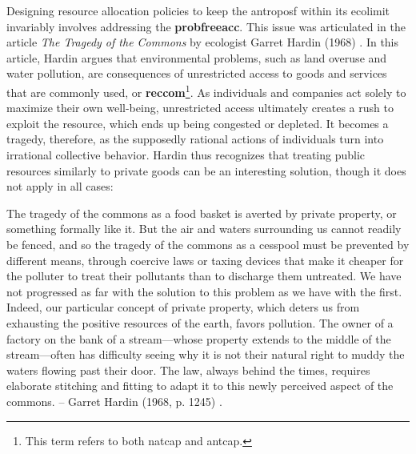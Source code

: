 \documentclass[./main_en.tex]{subfiles}
\begin{document}
\par Designing resource allocation policies to keep the \gls{antroposf} within its \gls{ecolimit} invariably involves addressing the \textbf{\gls{probfreeacc}}. This issue was articulated in the article \textit{The Tragedy of the Commons} by ecologist Garret Hardin (1968) \cite{Hardin1968a}. In this article, Hardin argues that environmental problems, such as land overuse and water pollution, are consequences of unrestricted access to goods and services that are commonly used, or \textbf{\gls{reccom}}\footnote{This term refers to both \gls{natcap} and \gls{antcap}.}. As individuals and companies act solely to maximize their own well-being, unrestricted access ultimately creates a rush to exploit the resource, which ends up being congested or depleted. It becomes a tragedy, therefore, as the supposedly rational actions of individuals turn into irrational collective behavior. Hardin thus recognizes that treating public resources similarly to private goods can be an interesting solution, though it does not apply in all cases:

\begin{adjustwidth}{100pt}{0pt}
\medskip
\small The tragedy of the commons as a food basket is averted by private property, or something formally like it. But the air and waters surrounding us cannot readily be fenced, and so the tragedy of the commons as a cesspool must be prevented by different means, through coercive laws or taxing devices that make it cheaper for the polluter to treat their pollutants than to discharge them untreated. We have not progressed as far with the solution to this problem as we have with the first. Indeed, our particular concept of private property, which deters us from exhausting the positive resources of the earth, favors pollution. The owner of a factory on the bank of a stream—whose property extends to the middle of the stream—often has difficulty seeing why it is not their natural right to muddy the waters flowing past their door. The law, always behind the times, requires elaborate stitching and fitting to adapt it to this newly perceived aspect of the commons. -- Garret Hardin (1968, p. 1245) \cite{Hardin1968a}.
\medskip
\end{adjustwidth}
\end{document}
